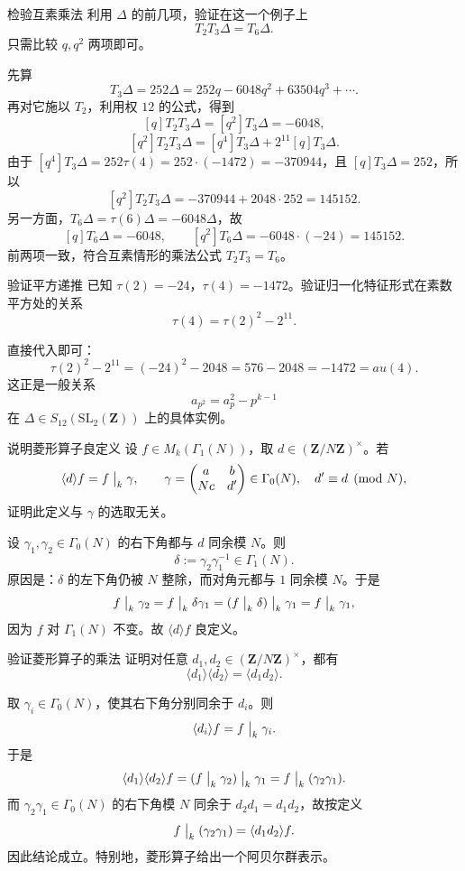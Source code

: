 \begin{problem}{检验互素乘法}
\easy
利用 $\Delta$ 的前几项，验证在这一个例子上
\[
T_2T_3\Delta=T_6\Delta.
\]
只需比较 $q,q^2$ 两项即可。
\end{problem}
\begin{solution}
先算
\[
T_3\Delta=252\Delta=252q-6048q^2+63504q^3+\cdots.
\]
再对它施以 $T_2$，利用权 $12$ 的公式，得到
\[
[q]T_2T_3\Delta=[q^2]T_3\Delta=-6048,
\]
\[
[q^2]T_2T_3\Delta=[q^4]T_3\Delta+2^{11}[q]T_3\Delta.
\]
由于 $[q^4]T_3\Delta=252\tau(4)=252\cdot(-1472)=-370944$，且 $[q]T_3\Delta=252$，所以
\[
[q^2]T_2T_3\Delta=-370944+2048\cdot252=145152.
\]
另一方面，$T_6\Delta=\tau(6)\Delta=-6048\Delta$，故
\[
[q]T_6\Delta=-6048,
\qquad
[q^2]T_6\Delta=-6048\cdot(-24)=145152.
\]
前两项一致，符合互素情形的乘法公式 $T_2T_3=T_6$。
\end{solution}

\begin{problem}{验证平方递推}
\easy
已知 $\tau(2)=-24$，$\tau(4)=-1472$。验证归一化特征形式在素数平方处的关系
\[
\tau(4)=\tau(2)^2-2^{11}.
\]
\end{problem}
\begin{solution}
直接代入即可：
\[
\tau(2)^2-2^{11}=(-24)^2-2048=576-2048=-1472=	au(4).
\]
这正是一般关系
\[
a_{p^2}=a_p^2-p^{k-1}
\]
在 $\Delta\in S_{12}(\mathrm{SL}_2(\mathbf Z))$ 上的具体实例。
\end{solution}

\begin{problem}{说明菱形算子良定义}
\easy
设 $f\in M_k(\Gamma_1(N))$，取 $d\in (\mathbf Z/N\mathbf Z)^\times$。若
\[
\langle d\rangle f=f\bigm|_k\gamma,
\qquad
\gamma=\begin{pmatrix}a&b\\Nc&d'\end{pmatrix}\in\Gamma_0(N),\quad d'\equiv d\pmod N,
\]
证明此定义与 $\gamma$ 的选取无关。
\end{problem}
\begin{solution}
设 $\gamma_1,\gamma_2\in\Gamma_0(N)$ 的右下角都与 $d$ 同余模 $N$。则
\[
\delta:=\gamma_2\gamma_1^{-1}\in\Gamma_1(N).
\]
原因是：$\delta$ 的左下角仍被 $N$ 整除，而对角元都与 $1$ 同余模 $N$。于是
\[
f\bigm|_k\gamma_2=f\bigm|_k\delta\gamma_1=(f\bigm|_k\delta)\bigm|_k\gamma_1=f\bigm|_k\gamma_1,
\]
因为 $f$ 对 $\Gamma_1(N)$ 不变。故 $\langle d\rangle f$ 良定义。
\end{solution}

\begin{problem}{验证菱形算子的乘法}
\easy
证明对任意 $d_1,d_2\in (\mathbf Z/N\mathbf Z)^\times$，都有
\[
\langle d_1\rangle\langle d_2\rangle=\langle d_1d_2\rangle.
\]
\end{problem}
\begin{solution}
取 $\gamma_i\in\Gamma_0(N)$，使其右下角分别同余于 $d_i$。则
\[
\langle d_i\rangle f=f\bigm|_k\gamma_i.
\]
于是
\[
\langle d_1\rangle\langle d_2\rangle f=(f\bigm|_k\gamma_2)\bigm|_k\gamma_1=f\bigm|_k(\gamma_2\gamma_1).
\]
而 $\gamma_2\gamma_1\in\Gamma_0(N)$ 的右下角模 $N$ 同余于 $d_2d_1=d_1d_2$，故按定义
\[
f\bigm|_k(\gamma_2\gamma_1)=\langle d_1d_2\rangle f.
\]
因此结论成立。特别地，菱形算子给出一个阿贝尔群表示。
\end{solution}

